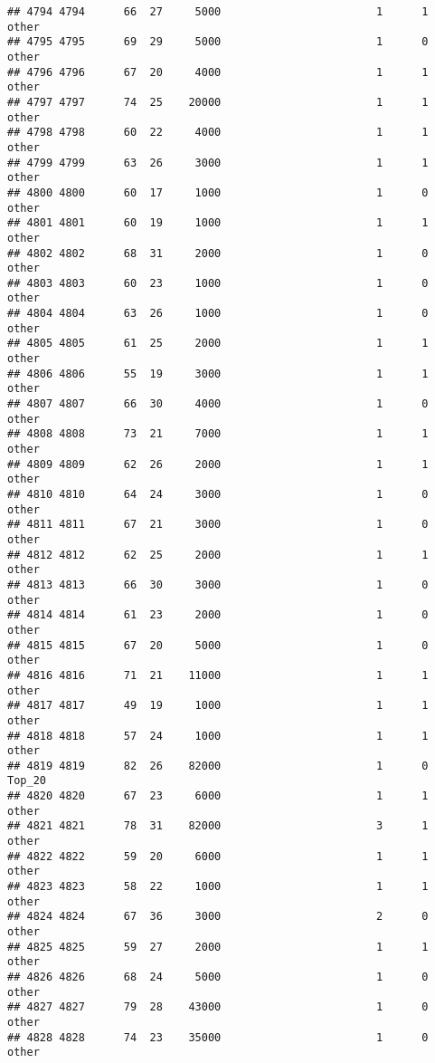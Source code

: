 \documentclass[
]{article}
\begin{document}
\begin{verbatim}
## 4794 4794      66  27     5000                        1      1    other
## 4795 4795      69  29     5000                        1      0    other
## 4796 4796      67  20     4000                        1      1    other
## 4797 4797      74  25    20000                        1      1    other
## 4798 4798      60  22     4000                        1      1    other
## 4799 4799      63  26     3000                        1      1    other
## 4800 4800      60  17     1000                        1      0    other
## 4801 4801      60  19     1000                        1      1    other
## 4802 4802      68  31     2000                        1      0    other
## 4803 4803      60  23     1000                        1      0    other
## 4804 4804      63  26     1000                        1      0    other
## 4805 4805      61  25     2000                        1      1    other
## 4806 4806      55  19     3000                        1      1    other
## 4807 4807      66  30     4000                        1      0    other
## 4808 4808      73  21     7000                        1      1    other
## 4809 4809      62  26     2000                        1      1    other
## 4810 4810      64  24     3000                        1      0    other
## 4811 4811      67  21     3000                        1      0    other
## 4812 4812      62  25     2000                        1      1    other
## 4813 4813      66  30     3000                        1      0    other
## 4814 4814      61  23     2000                        1      0    other
## 4815 4815      67  20     5000                        1      0    other
## 4816 4816      71  21    11000                        1      1    other
## 4817 4817      49  19     1000                        1      1    other
## 4818 4818      57  24     1000                        1      1    other
## 4819 4819      82  26    82000                        1      0   Top_20
## 4820 4820      67  23     6000                        1      1    other
## 4821 4821      78  31    82000                        3      1    other
## 4822 4822      59  20     6000                        1      1    other
## 4823 4823      58  22     1000                        1      1    other
## 4824 4824      67  36     3000                        2      0    other
## 4825 4825      59  27     2000                        1      1    other
## 4826 4826      68  24     5000                        1      0    other
## 4827 4827      79  28    43000                        1      0    other
## 4828 4828      74  23    35000                        1      0    other

\end{verbatim}
\end{document}
